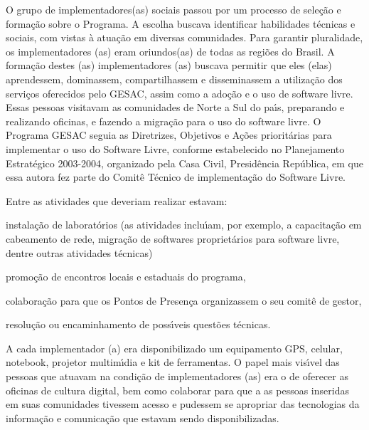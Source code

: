 \documentclass[
12pt,		%
openright,	%
twoside,  %
a4paper,			%
chapter=TITLE,		%
english,			%
french,				%
spanish,			%
brazil				%
]{USPSC-classe/USPSC}
\begin{document}
O grupo de implementadores(as) sociais passou por um processo de sele\c{c}\~ao e forma\c{c}\~ao sobre o Programa. A escolha buscava identificar habilidades t\'ecnicas e sociais, com vistas \`a atua\c{c}\~ao em diversas comunidades. Para garantir pluralidade, os implementadores (as) eram oriundos(as) de todas as regi\~oes do Brasil. A forma\c{c}\~ao destes (as) implementadores (as) buscava  permitir que eles (elas) aprendessem, dominassem, compartilhassem  e disseminassem a utiliza\c{c}\~ao dos servi\c{c}os oferecidos pelo GESAC, assim como a ado\c{c}\~ao e o uso de software livre. Essas pessoas visitavam as comunidades de Norte a Sul do pa\'{\i}s, preparando e realizando oficinas, e fazendo a migra\c{c}\~ao para o uso do software livre. O Programa GESAC seguia as Diretrizes, Objetivos e A\c{c}\~oes priorit\'arias para implementar o uso do Software Livre, conforme estabelecido no Planejamento Estrat\'egico 2003-2004, organizado pela  Casa Civil, Presid\^encia Rep\'ublica, em que essa autora fez parte do Comit\^e T\'ecnico de implementa\c{c}\~ao do Software Livre.









Entre as atividades que deveriam realizar estavam:










\begin{alineas}
\item instala\c{c}\~ao de laborat\'orios (as atividades inclu\'{\i}am, por exemplo, a capacita\c{c}\~ao em cabeamento de rede, migra\c{c}\~ao de softwares propriet\'arios para software livre, dentre outras atividades t\'ecnicas)
\item promo\c{c}\~ao de encontros locais e estaduais do programa,
\item colabora\c{c}\~ao para que os  Pontos de Presen\c{c}a organizassem o seu comit\^e de gestor,
\item resolu\c{c}\~ao ou encaminhamento de poss\'{\i}veis quest\~oes t\'ecnicas.
\end{alineas}

A cada implementador (a) era disponibilizado um equipamento GPS, celular, notebook, projetor multim\'{\i}dia e kit de ferramentas. O papel mais vis\'{\i}vel das pessoas que atuavam na condi\c{c}\~ao de implementadores (as) era o de oferecer as oficinas de cultura digital, bem como colaborar para que a as pessoas inseridas em suas comunidades tivessem acesso e pudessem se apropriar das tecnologias da informa\c{c}\~ao e comunica\c{c}\~ao que estavam sendo disponibilizadas.
\end{document}
